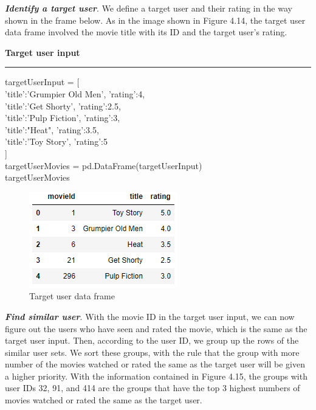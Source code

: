\textbf{\textit{Identify a target user}}. We define a target user and their rating in the way shown in the frame below. As in the image shown in Figure 4.14, the target user data frame involved the movie title with its ID and the target user’s rating. 
\begin{framed} 
\textbf{Target user input}\\
\rule{\textwidth}{0.1mm}
targetUserInput = [\\
{'title':'Grumpier Old Men', 'rating':4},\\
{'title':'Get Shorty', 'rating':2.5},\\
{'title':'Pulp Fiction', 'rating':3},\\
{'title':"Heat", 'rating':3.5},\\
{'title':'Toy Story', 'rating':5}\\
         ] \\
targetUserMovies = pd.DataFrame(targetUserInput)\\
targetUserMovies\\
\end{framed} 

\begin{figure}[htbp]
\centering
\includegraphics[scale =1]{figure/targetcf1.png}
\caption{Target user data frame}
\end{figure}

\textbf{\textit{Find similar user}}. With the movie ID in the target user input, we can now figure out the users who have seen and rated the movie, which is the same as the target user input. Then, according to the user ID, we group up the rows of the similar user sets. We sort these groups, with the rule that the group with more number of the movies watched or rated the same as the target user will be given a higher priority. With the information contained in Figure 4.15, the groups with user IDs 32, 91, and 414 are the groups that have the top 3 highest numbers of movies watched or rated the same as the target user.


